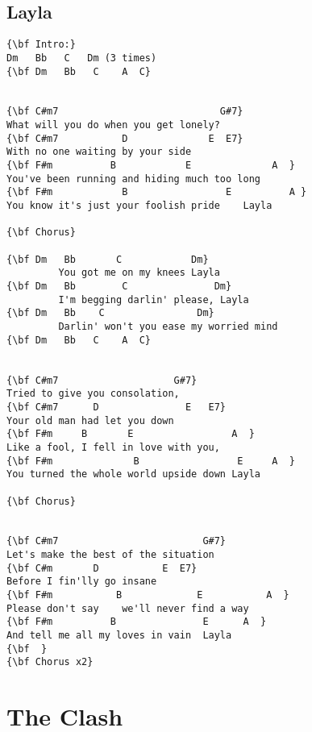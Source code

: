 \documentclass[a4paper]{article}
\begin{document}
\subsection{Layla} %
\label{sub:Layla }
\begin{Verbatim}[commandchars=\\\{\}]
{\bf Intro:}
Dm   Bb   C   Dm (3 times) 
{\bf Dm   Bb   C    A  C}


{\bf C#m7                            G#7}
What will you do when you get lonely?
{\bf C#m7           D              E  E7}
With no one waiting by your side
{\bf F#m          B            E              A  }
You've been running and hiding much too long
{\bf F#m            B                 E          A }
You know it's just your foolish pride    Layla

{\bf Chorus}

{\bf Dm   Bb       C            Dm}
         You got me on my knees Layla
{\bf Dm   Bb        C               Dm}
         I'm begging darlin' please, Layla
{\bf Dm   Bb    C                Dm}
         Darlin' won't you ease my worried mind
{\bf Dm   Bb   C    A  C}


{\bf C#m7                    G#7}
Tried to give you consolation,
{\bf C#m7      D               E   E7}
Your old man had let you down
{\bf F#m     B       E                 A  }
Like a fool, I fell in love with you,
{\bf F#m              B                 E     A  }
You turned the whole world upside down Layla

{\bf Chorus}


{\bf C#m7                         G#7}
Let's make the best of the situation
{\bf C#m       D           E  E7}
Before I fin'lly go insane
{\bf F#m           B             E           A  }
Please don't say    we'll never find a way
{\bf F#m          B               E      A  }
And tell me all my loves in vain  Layla
{\bf  }
{\bf Chorus x2}
\end{Verbatim}
\newpage
\section{The Clash} %
\label{sec:The Clas}
\end{document}

